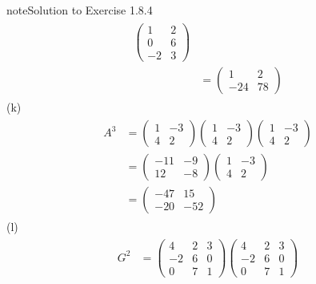 \documentclass[letterpaper,10pt,english]{jupyterBook}
\begin{document}
\begin{sphinxadmonition}{note}{Solution to Exercise 1.8.4}
\begin{equation*}
\begin{split}
\begin{align*}
    \begin{pmatrix} 1 & 2 \\ 0 & 6 \\ -2 & 3 \end{pmatrix} \\
    &= \begin{pmatrix} 1 & 2 \\ -24 & 78 \end{pmatrix}
\end{align*} \end{split}
\end{equation*}
\sphinxAtStartPar
(k)  
\begin{equation*}
\begin{split} \begin{align*}
    A^3 &= \begin{pmatrix} 1 & -3 \\ 4 & 2 \end{pmatrix}
    \begin{pmatrix} 1 & -3 \\ 4 & 2 \end{pmatrix}
    \begin{pmatrix} 1 & -3 \\ 4 & 2 \end{pmatrix} \\
    &= \begin{pmatrix} -11 & -9 \\ 12 & -8 \end{pmatrix}
    \begin{pmatrix} 1 & -3 \\ 4 & 2 \end{pmatrix} \\
    &= \begin{pmatrix} -47 & 15 \\ -20 & -52 \end{pmatrix}
\end{align*} \end{split}
\end{equation*}
\sphinxAtStartPar
(l)  
\begin{equation*}
\begin{split} \begin{align*}
    G^2 &= \begin{pmatrix} 4 & 2 & 3 \\ -2 & 6 & 0 \\ 0 & 7 & 1 \end{pmatrix}
    \begin{pmatrix} 4 & 2 & 3 \\ -2 & 6 & 0 \\ 0 & 7 & 1 \end{pmatrix} \\

\end{align*}
\end{split}
\end{equation*}
\end{sphinxadmonition}
\end{document}
